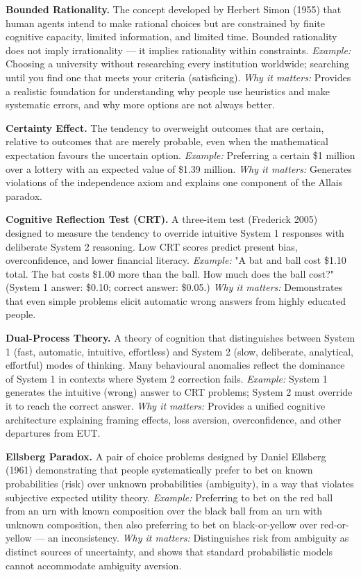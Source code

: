\documentclass[12pt, letterpaper]{article}
\begin{document}
\textbf{Bounded Rationality.} The concept developed by Herbert Simon (1955) that human agents intend to make rational choices but are constrained by finite cognitive capacity, limited information, and limited time. Bounded rationality does not imply irrationality --- it implies rationality within constraints. \textit{Example:} Choosing a university without researching every institution worldwide; searching until you find one that meets your criteria (satisficing). \textit{Why it matters:} Provides a realistic foundation for understanding why people use heuristics and make systematic errors, and why more options are not always better.

\textbf{Certainty Effect.} The tendency to overweight outcomes that are certain, relative to outcomes that are merely probable, even when the mathematical expectation favours the uncertain option. \textit{Example:} Preferring a certain \$1 million over a lottery with an expected value of \$1.39 million. \textit{Why it matters:} Generates violations of the independence axiom and explains one component of the Allais paradox.

\textbf{Cognitive Reflection Test (CRT).} A three-item test (Frederick 2005) designed to measure the tendency to override intuitive System 1 responses with deliberate System 2 reasoning. Low CRT scores predict present bias, overconfidence, and lower financial literacy. \textit{Example:} "A bat and ball cost \$1.10 total. The bat costs \$1.00 more than the ball. How much does the ball cost?" (System 1 answer: \$0.10; correct answer: \$0.05.) \textit{Why it matters:} Demonstrates that even simple problems elicit automatic wrong answers from highly educated people.

\textbf{Dual-Process Theory.} A theory of cognition that distinguishes between System 1 (fast, automatic, intuitive, effortless) and System 2 (slow, deliberate, analytical, effortful) modes of thinking. Many behavioural anomalies reflect the dominance of System 1 in contexts where System 2 correction fails. \textit{Example:} System 1 generates the intuitive (wrong) answer to CRT problems; System 2 must override it to reach the correct answer. \textit{Why it matters:} Provides a unified cognitive architecture explaining framing effects, loss aversion, overconfidence, and other departures from EUT.

\textbf{Ellsberg Paradox.} A pair of choice problems designed by Daniel Ellsberg (1961) demonstrating that people systematically prefer to bet on known probabilities (risk) over unknown probabilities (ambiguity), in a way that violates subjective expected utility theory. \textit{Example:} Preferring to bet on the red ball from an urn with known composition over the black ball from an urn with unknown composition, then also preferring to bet on black-or-yellow over red-or-yellow --- an inconsistency. \textit{Why it matters:} Distinguishes risk from ambiguity as distinct sources of uncertainty, and shows that standard probabilistic models cannot accommodate ambiguity aversion.
\end{document}
